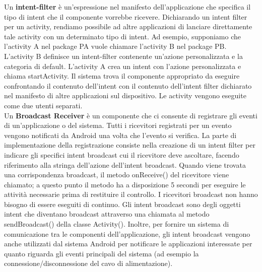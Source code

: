 \documentclass[12pt]{report}
\begin{document}
Un \textbf{intent-filter} è un'espressione nel manifesto dell'applicazione che specifica il tipo di intent che il componente vorrebbe ricevere. Dichiarando un intent filter per un activity, rendiamo possibile ad altre applicazioni di lanciare direttamente tale activity con un determinato tipo di intent. Ad esempio, supponiamo che l'activity A nel package PA vuole chiamare l'activity B nel package PB. L'activity B definisce un intent-filter contenente un'azione personalizzata e la categoria di default. L'activity A crea un intent con l'azione personalizzata e chiama startActivity. Il sistema trova il componente appropriato da eseguire confrontando il contenuto dell'intent con il contenuto dell'intent filter dichiarato nel manifesto di altre applicazioni sul dispositivo. Le activity vengono eseguite come due utenti separati.\\Un \textbf{Broadcast Receiver} è un componente che ci consente di registrare gli eventi di un'applicazione o del sistema. Tutti i ricevitori registrati per un evento vengono notificati da Android una volta che l'evento si verifica. La parte di implementazione della registrazione consiste nella creazione di un intent filter per indicare gli specifici intent broadcast cui il ricevitore deve ascoltare, facendo riferimento alla stringa dell'azione dell'intent broadcast. Quando viene trovata una corrispondenza broadcast, il metodo onReceive() del ricevitore viene chiamato; a questo punto il metodo ha a disposizione 5 secondi per eseguire le attività necessarie prima di restituire il controllo. I ricevitori broadcast non hanno bisogno di essere eseguiti di continuo. Gli intent broadcast sono degli oggetti intent che diventano broadcast attraverso una chiamata al metodo sendBroadcast() della classe Activity(). Inoltre, per fornire un sistema di comunicazione tra le componenti dell'applicazione, gli intent broadcast vengono anche utilizzati dal sistema Android per notificare le applicazioni interessate per quanto riguarda gli eventi principali del sistema (ad esempio la connessione/disconnessione del cavo di alimentazione).
\end{document}
